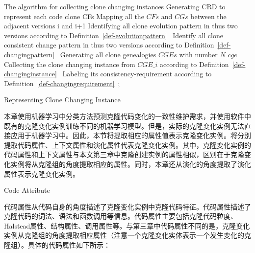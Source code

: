 \begin{minipage}{0.8\textwidth}
\centering
\begin{algorithm}[H]
 {The algorithm for collecting clone changing instances}
\label{alg-collectionchanging}
{ 
 Generating CRD to represent each code clone {CFs}\;
 Mapping all the $CFs$ and $CGs$ between the adjacent versions {i} and {i+1}\;
 Identifying all clone evolution pattern in thus two versions according to Definition~\ref{def-evolutionpattern}~\;
 Identify all clone consistent change pattern in thus two versions according to Definition~\ref{def-changingpattern}~\;
}
Generating all clone genealogies $CGEs$ with number $N\_cge$\;
{ 
 Collecting the clone changing instance from $CGE\_i$ according to Definition~\ref{def-changinginstance}~\; 
 Labeling its consistency-requirement according to Definition~\ref{def-changingrequirement}~;
}
\end{algorithm}
\end{minipage}

{Representing Clone Changing Instance}
\label{lab-changingattribute}

本章使用机器学习中分类方法预测克隆代码变化的一致性维护需求，并使用软件中既有的克隆变化实例训练不同的机器学习模型。但是，实际的克隆变化实例无法直接应用于机器学习中。因此，本节将提取相应的属性值表示克隆变化实例。将分别提取代码属性、上下文属性和演化属性代表克隆变化实例。其中，克隆变化实例的代码属性和上下文属性与本文第三章中克隆创建实例的属性相似，区别在于克隆变化实例将从克隆组的角度提取相应的属性。同时，本章还从演化的角度提取了演化属性表示克隆变化实例。

{Code Attribute}

代码属性从代码自身的角度描述了克隆变化实例中克隆代码特征。代码属性描述了克隆代码的词法、语法和函数调用等信息。代码属性主要包括克隆代码粒度、Halstead属性、结构属性、调用属性等。与第三章中代码属性不同的是，克隆变化实例从克隆组的角度提取相应属性（注意一个克隆变化实体表示一个发生变化的克隆组）。具体的代码属性如下所示：

